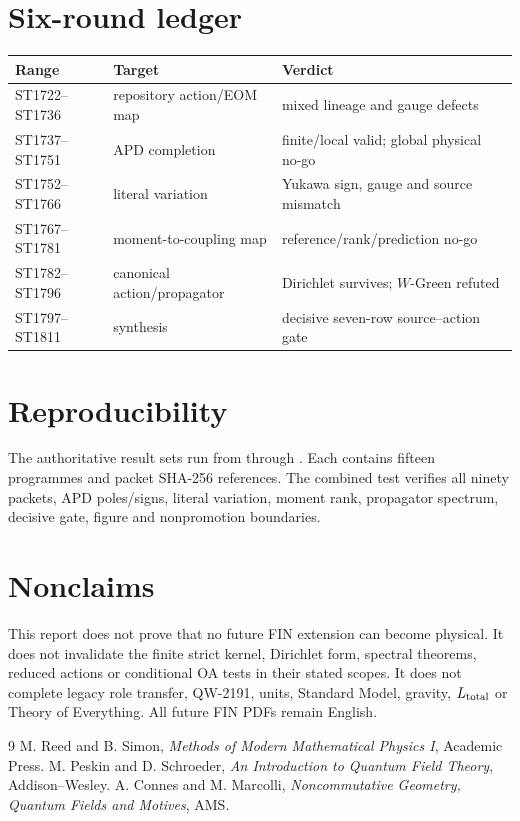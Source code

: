 \documentclass[11pt,a4paper]{article}
\begin{document}
\appendix
\section{Six-round ledger}
\begin{longtable}{@{}p{}p{}p{}@{}}
\toprule
Range & Target & Verdict \\
\midrule\endhead
ST1722--ST1736 & repository action/EOM map & mixed lineage and gauge defects \\
ST1737--ST1751 & APD completion & finite/local valid; global physical no-go \\
ST1752--ST1766 & literal variation & Yukawa sign, gauge and source mismatch \\
ST1767--ST1781 & moment-to-coupling map & reference/rank/prediction no-go \\
ST1782--ST1796 & canonical action/propagator & Dirichlet survives; $W$-Green refuted \\
ST1797--ST1811 & synthesis & decisive seven-row source--action gate \\
\bottomrule
\end{longtable}

\section{Reproducibility}
The authoritative result sets run from
 through
.  Each contains fifteen programmes and
packet SHA-256 references.  The combined test
 verifies all ninety packets, APD poles/signs,
literal variation, moment rank, propagator spectrum, decisive gate, figure and
nonpromotion boundaries.

\section{Nonclaims}
This report does not prove that no future FIN extension can become physical.
It does not invalidate the finite strict kernel, Dirichlet form, spectral
theorems, reduced actions or conditional OA tests in their stated scopes.  It
does not complete legacy role transfer, QW-2191, units, Standard Model,
gravity, $L_{\rm total}$ or Theory of Everything.  All future FIN PDFs remain
English.

\begin{thebibliography}{9}
 M. Reed and B. Simon, \emph{Methods of Modern Mathematical Physics I}, Academic Press.
 M. Peskin and D. Schroeder, \emph{An Introduction to Quantum Field Theory}, Addison--Wesley.
 A. Connes and M. Marcolli, \emph{Noncommutative Geometry, Quantum Fields and Motives}, AMS.
\end{thebibliography}
\end{document}
